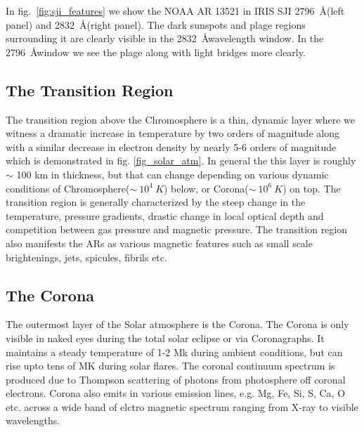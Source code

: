 In fig.~\ref{fig:sji_features} we show the NOAA AR 13521 in IRIS SJI 2796~\AA (left panel) and 2832~\AA (right panel). The dark sunspots and plage regions surrounding it are clearly visible in the 2832~\AA wavelength window. In the 2796~\AA window we see the plage along with light bridges more clearly. 

\subsection{The Transition Region}\label{transition-region}

The transition region above the Chromosphere is a thin, dynamic layer where we witness a dramatic increase in temperature by two orders of magnitude along with a similar decrease in electron density by nearly 5-6 orders of magnitude which is demonstrated in fig. \ref{fig_solar_atm}. In general the this layer is roughly $\sim$ 100 km in thickness, but that can change depending on various dynamic conditions of Chromosphere($\sim~10^{4}~K$) below, or Corona($\sim~10^{6}~K$) on top. The transition region is generally characterized by the steep change in the temperature, pressure gradients, drastic change in local optical depth and competition between gas pressure and magnetic pressure. The transition region also manifests the ARs as various magnetic features such as small scale brightenings, jets, spicules, fibrils etc. 

\subsection{The Corona}\label{corona}

The outermost layer of the Solar atmosphere is the Corona. The Corona is only visible in naked eyes during the total solar eclipse or via Coronagraphs. It maintains a steady temperature of 1-2 Mk during ambient conditions, but can rise upto tens of MK during solar flares. The coronal continuum spectrum is produced due to Thompson scattering of photons from photosphere off coronal electrons. Corona also emits in various emission lines, e.g. Mg, Fe, Si, S, Ca, O etc. across a wide band of elctro magnetic spectrum ranging from X-ray to visible wavelengths. 


